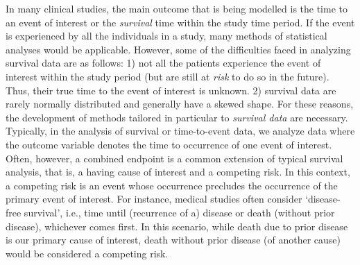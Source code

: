 In many clinical studies, the main outcome that is being modelled is the time to an event of interest or the \textit{survival} time within the study time period. If the event is experienced by all the individuals in a study, many methods of statistical analyses would be applicable. However, some of the difficulties faced in analyzing survival data are as follows: 1) not all the patients experience the event of interest within the study period (but are still at \textit{risk} to do so in the future). Thus, their true time to the event of interest is unknown. 2) survival data are rarely normally distributed and generally have a skewed shape. For these reasons, the development of methods tailored in particular to \textit{survival data} are necessary. Typically, in the analysis of survival or time-to-event data, we analyze data where the outcome variable denotes the time to occurrence of one event of interest. Often, however, a combined endpoint is a common extension of typical survival analysis, that is, a having cause of interest and a competing risk.  In this context, a competing risk is an event whose occurrence precludes the occurrence of the primary event of interest. For instance, medical studies often consider ‘disease-free survival’, i.e., time until (recurrence of a) disease or death (without prior disease), whichever comes first. In this scenario, while death due to prior disease is our primary cause of interest, death without prior disease (of another cause) would be considered a competing risk.
\medskip \par
